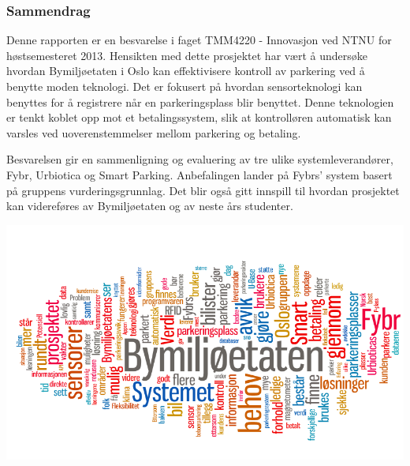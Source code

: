 \documentclass[xetex]{beamer}
\begin{document}
\begin{frame}
	\frametitle{Sammendrag}
	Denne rapporten er en besvarelse i faget \alert{TMM4220 - Innovasjon} ved NTNU for høstsemesteret 2013. Hensikten med dette prosjektet har vært å undersøke hvordan \alert{Bymiljøetaten i Oslo} kan \alert{effektivisere kontroll av parkering} ved å benytte moden teknologi. Det er fokusert på hvordan sensorteknologi kan benyttes for å registrere når en parkeringsplass blir benyttet. Denne teknologien er tenkt koblet opp mot et betalingssystem, slik at kontrolløren automatisk kan varsles ved uoverenstemmelser mellom parkering og betaling.

	Besvarelsen gir en \alert{sammenligning og evaluering} av tre ulike systemleverandører, \alert{Fybr}, \alert{Urbiotica} og \alert{Smart Parking}. Anbefalingen lander på Fybrs’ system basert på gruppens vurderingsgrunnlag. Det blir også gitt innspill til hvordan prosjektet kan videreføres av Bymiljøetaten og av neste års studenter. 
	
	\centerline{\includegraphics[scale=0.35]{grafikk/ordsky.png}}


	
	\thispagestyle{empty}
\end{frame}
\end{document}
